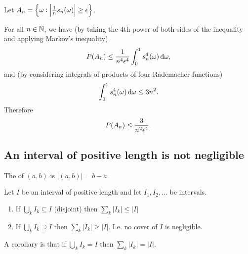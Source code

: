 \begin{lemma}
  Let $A_n = \Big\{\omega : \Big|\frac{1}{n} s_n(\omega)\Big| \geq \epsilon\Big\}$.

  For all $n \in \mathbb{N}$, we have (by taking the 4th power of both sides of the inequality and applying Markov's
  inequality)
  \begin{align*}
    P(A_n) \leq \frac{1}{n^4\eps^4} \int_0^1 s_n^4(\om) \d\om,
  \end{align*}
  and (by considering integrals of products of four Rademacher functions)
  \begin{align*}
    \int_0^1 s_n^4(\om) \d\om \leq 3n^2.
  \end{align*}
  Therefore
  \begin{align*}
    P(A_n) \leq \frac{3}{n^2\epsilon^4}.
  \end{align*}
\end{lemma}

\newpage
\subsection{An interval of  positive length is not negligible}

\begin{definition*}
  The  of $(a, b)$ is $|(a, b)| = b - a$.
\end{definition*}

\begin{theorem*}
  Let $I$ be an interval of positive length and let $I_1, I_2, \ldots$ be intervals.
  \begin{enumerate}
  \item If $\bigcup_k I_k \subseteq I$ (disjoint) then $\sum_k |I_k| \leq |I|$
  \item If $\bigcup_k I_k \supseteq I$ then $\sum_k |I_k| \geq |I|$. I.e. no cover of $I$ is negligible.
  \end{enumerate}
  A corollary is that if $\bigcup_k I_k = I$ then $\sum_k |I_k| = |I|$.
\end{theorem*}


